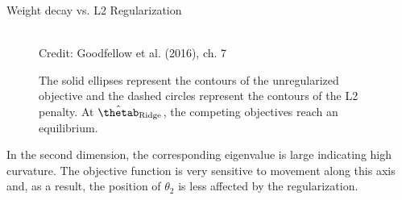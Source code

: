 \begin{vbframe}{Weight decay vs. L2 Regularization}
    \begin{figure}
    \centering
      \tiny{\\ Credit: Goodfellow et al. (2016), ch. 7}
      \caption{\footnotesize The solid ellipses represent the contours of the unregularized objective and the dashed circles represent the contours of the L2 penalty. At $\hat{\thetab}_{\text{Ridge}}$, the competing objectives reach an equilibrium.}
  \end{figure}
  
    In the second dimension, the corresponding eigenvalue is large indicating high curvature. The objective function is very sensitive to movement along this axis and, as a result, the position of $\theta_2$ is less affected by the regularization.
  
\end{vbframe}

\endlecture


